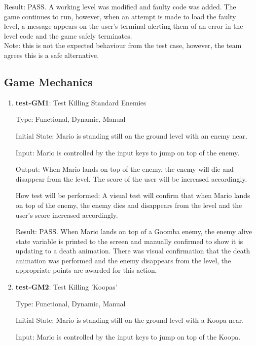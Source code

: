 \documentclass[12pt, titlepage]{article}
\begin{document}
\begin{enumerate}
Result: PASS. A working level was modified and faulty code was added. The game continues to run, however, when an attempt is made to load the faulty level, a message appears on the user's terminal alerting them of an error in the level code and the game safely terminates.\\ 
Note: this is not the expected behaviour from the test case, however, the team agrees this is a safe alternative.
\end{enumerate}

\subsection{Game Mechanics}

\begin{enumerate}

\item{\textbf{test-GM1}: Test Killing Standard Enemies\\}

Type: Functional, Dynamic, Manual
					
Initial State: Mario is standing still on the ground level with an enemy near.
					
Input: Mario is controlled by the input keys to jump on top of the enemy.
					
Output: When Mario lands on top of the enemy, the enemy will die and disappear from the level. The score of the user will be increased accordingly.
					
How test will be performed: A visual test will confirm that when Mario lands on top of the enemy, the enemy dies and disappears from the level and the user's score increased accordingly.

Result: PASS. When Mario lands on top of a Goomba enemy, the enemy alive state variable is printed to the screen and manually confirmed to show it is updating to a death animation. There was visual confirmation that the death animation was performed and the enemy disappears from the level, the appropriate points are awarded for this action.

\item{\textbf{test-GM2}: Test Killing 'Koopas'\\}

Type: Functional, Dynamic, Manual
					
Initial State: Mario is standing still on the ground level with a Koopa near.
					
Input: Mario is controlled by the input keys to jump on top of the Koopa.
					

\end{enumerate}
\end{document}
